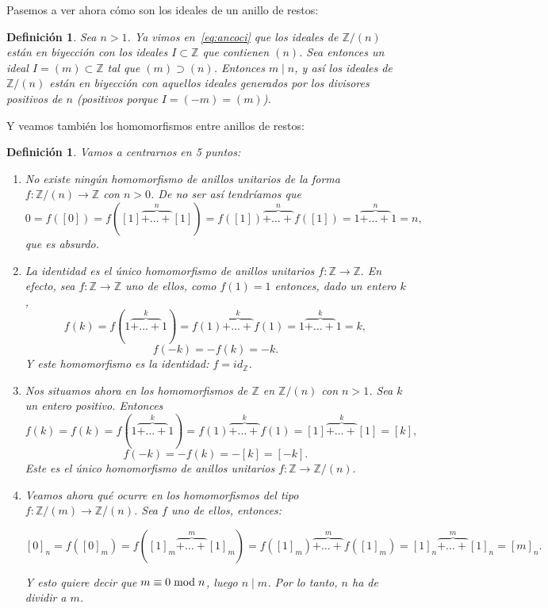 \documentclass[12pt]{article}
\newtheorem{definition}[theorem]{Definición}
\begin{document}
Pasemos a ver ahora cómo son los ideales de un anillo de restos:

\begin{definition} Sea $n > 1$. Ya vimos en~\ref{eq:ancoci} que los ideales de $\mathbb{Z}/(n)$ están en biyección con los ideales $I \subset \mathbb{Z}$ que contienen $(n)$. Sea entonces un ideal $I = (m) \subset \mathbb{Z}$ tal que $(m) \supset (n)$. Entonces $m \mid n$, y así los ideales de $\mathbb{Z}/(n)$ están en biyección con aquellos ideales generados por los divisores positivos de $n$ (positivos porque $I = (-m) = (m)$).
\end{definition}

Y veamos también los homomorfismos entre anillos de restos:
\begin{definition} Vamos a centrarnos en 5 puntos:\begin{enumerate}
\item No existe ningún homomorfismo de anillos unitarios de la forma $f \colon \mathbb{Z}/(n) \longrightarrow \mathbb{Z}$ con $n > 0$. De no ser así tendríamos que $$0 = f([0]) = f([1] \overbrace{+ \ldots +}^{n} [1]) = f([1]) \overbrace{+ \ldots +}^{n} f([1])= 1 \overbrace{+ \ldots +}^{n} 1 = n,$$ que es absurdo.
\item La identidad es el único homomorfismo de anillos unitarios $f \colon \mathbb{Z} \longrightarrow \mathbb{Z}.$ En efecto, sea $f \colon \mathbb{Z} \longrightarrow \mathbb{Z}$ uno de ellos, como $f(1) = 1$ entonces, dado un entero $k$, $$f(k) = f(1 \overbrace{+ \ldots +}^{k} 1) = f(1) \overbrace{+ \ldots +}^{k}  f(1) = 1 \overbrace{+ \ldots +}^{k}  1 = k,$$ $$f(-k) = -f(k) = -k.$$ Y este homomorfismo es la identidad: $f = id_{\mathbb{Z}}$.
\item Nos situamos ahora en los homomorfismos de $\mathbb{Z}$ en $\mathbb{Z}/(n)$ con $n>1$. Sea $k$ un entero positivo. Entonces $$f(k) = f(k) = f(1 \overbrace{+ \ldots +}^{k} 1) = f(1) \overbrace{+ \ldots +}^{k}  f(1) = [1]  \overbrace{+ \ldots +}^{k}  [1] = [k],$$ $$f(-k) = -f(k) = -[k] = [-k].$$ Este es el único homomorfismo de anillos unitarios $f \colon \mathbb{Z} \longrightarrow \mathbb{Z}/(n).$
\item Veamos ahora qué ocurre en los homomorfismos del tipo $f \colon \mathbb{Z}/(m) \longrightarrow \mathbb{Z}/(n)$. Sea $f$ uno de ellos, entonces: \begin{center}$[0]_{n} = f([0]_{m}) = f([1]_{m} \overbrace{+ \ldots +}^{m}  [1]_{m}) =   f([1]_{m})  \overbrace{+ \ldots +}^{m}  f([1]_{m}) =  [1]_{n}  \overbrace{+ \ldots +}^{m}  [1]_{n} = [m]_{n}.$\end{center} Y esto quiere decir que $m \equiv 0 \hspace{0.1cm} \text{mod} \hspace{0.1cm} n$, luego $n \mid m$. Por lo tanto, $n$ ha de dividir a $m$.

\end{enumerate}
\end{definition}
\end{document}
